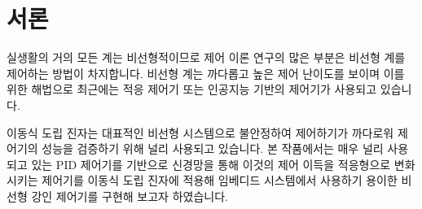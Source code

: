 \section{서론}

실생활의 거의 모든 계는 비선형적이므로 제어 이론 연구의 많은 부분은 비선형 계를 제어하는 방법이 차지합니다. 비선형 계는 까다롭고 높은 제어 난이도를 보이며 이를 위한 해법으로 최근에는 적응 제어기 또는 인공지능 기반의 제어기가 사용되고 있습니다. 

이동식 도립 진자는 대표적인 비선형 시스템으로 불안정하여 제어하기가 까다로워 제어기의 성능을 검증하기 위해 널리 사용되고 있습니다. 본 작품에서는 매우 널리 사용되고 있는 PID 제어기를 기반으로 신경망을 통해 이것의 제어 이득을 적응형으로 변화시키는 제어기를 이동식 도립 진자에 적용해 임베디드 시스템에서 사용하기 용이한 비선형 강인 제어기를 구현해 보고자 하였습니다. 
